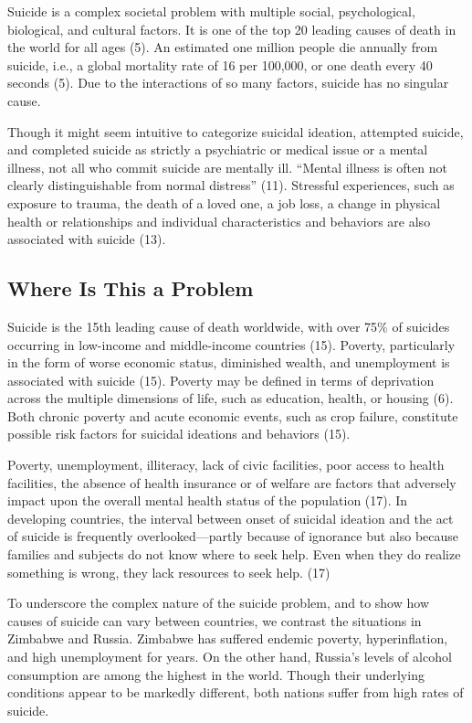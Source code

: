 \documentclass[]{article}
\begin{document}
Suicide is a complex societal problem with multiple social,
psychological, biological, and cultural factors. It is one of the top 20
leading causes of death in the world for all ages (5). An estimated one
million people die annually from suicide, i.e., a global mortality rate
of 16 per 100,000, or one death every 40 seconds (5). Due to the
interactions of so many factors, suicide has no singular cause.

Though it might seem intuitive to categorize suicidal ideation,
attempted suicide, and completed suicide as strictly a psychiatric or
medical issue or a mental illness, not all who commit suicide are
mentally ill. ``Mental illness is often not clearly distinguishable from
normal distress'' (11). Stressful experiences, such as exposure to
trauma, the death of a loved one, a job loss, a change in physical
health or relationships and individual characteristics and behaviors are
also associated with suicide (13).

\subsection{Where Is This a Problem}\label{where-is-this-a-problem}

Suicide is the 15th leading cause of death worldwide, with over 75\% of
suicides occurring in low-income and middle-income countries (15).
Poverty, particularly in the form of worse economic status, diminished
wealth, and unemployment is associated with suicide (15). Poverty may be
defined in terms of deprivation across the multiple dimensions of life,
such as education, health, or housing (6). Both chronic poverty and
acute economic events, such as crop failure, constitute possible risk
factors for suicidal ideations and behaviors (15).

Poverty, unemployment, illiteracy, lack of civic facilities, poor access
to health facilities, the absence of health insurance or of welfare are
factors that adversely impact upon the overall mental health status of
the population (17). In developing countries, the interval between onset
of suicidal ideation and the act of suicide is frequently
overlooked---partly because of ignorance but also because families and
subjects do not know where to seek help. Even when they do realize
something is wrong, they lack resources to seek help. (17)

To underscore the complex nature of the suicide problem, and to show how
causes of suicide can vary between countries, we contrast the situations
in Zimbabwe and Russia. Zimbabwe has suffered endemic poverty,
hyperinflation, and high unemployment for years. On the other hand,
Russia's levels of alcohol consumption are among the highest in the
world. Though their underlying conditions appear to be markedly
different, both nations suffer from high rates of suicide.
\end{document}
